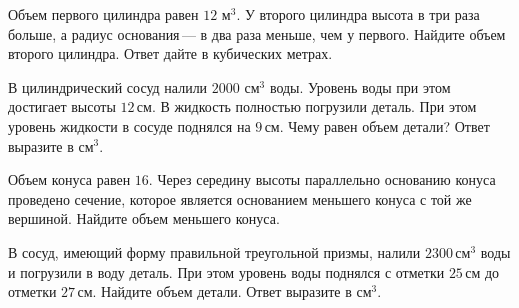 \begin{consultation}
\begin{listofex}
		\item Объем первого цилиндра равен \(12\) м\(^3\). У второго цилиндра высота в три раза больше, а радиус основания --- в два раза меньше, чем у первого. Найдите объем второго цилиндра. Ответ дайте в кубических метрах.
		\item В цилиндрический сосуд налили \(2000\) см\(^3\) воды. Уровень воды при этом достигает высоты \(12\) см. В жидкость полностью погрузили деталь. При этом уровень жидкости в сосуде поднялся на \(9\) см. Чему равен объем детали? Ответ выразите в см\(^3\).
		\item Объем конуса равен \(16\). Через середину высоты параллельно основанию конуса проведено сечение, которое является основанием меньшего конуса с той же вершиной. Найдите объем меньшего конуса.
		\item В сосуд, имеющий форму правильной треугольной призмы, налили \(2300\) см\(^3\) воды и погрузили в воду деталь. При этом уровень воды поднялся с отметки \(25\) см до отметки \(27\) см. Найдите объем детали. Ответ выразите в см\(^3\).
	\end{listofex}
\end{consultation}
